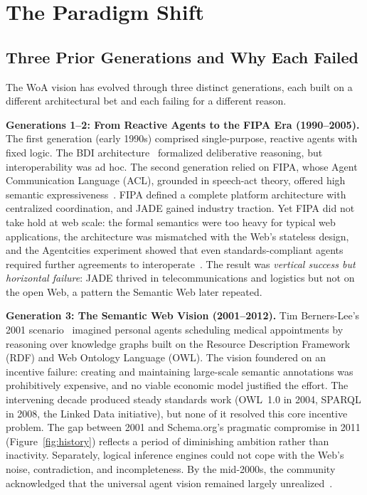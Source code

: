 \documentclass[10pt,twocolumn]{article}
\begin{document}
\section{The Paradigm Shift}\label{sec:paradigm}

\subsection{Three Prior Generations and Why Each Failed}

The WoA vision has evolved through three distinct generations, each built on a different architectural bet and each failing for a different reason.

\textbf{Generations 1--2: From Reactive Agents to the FIPA Era (1990--2005).}  The first generation (early 1990s) comprised single-purpose, reactive agents with fixed logic. The BDI architecture~\cite{Rao_1995} formalized deliberative reasoning, but interoperability was ad hoc.  The second generation relied on FIPA, whose Agent Communication Language (ACL), grounded in speech-act theory, offered high semantic expressiveness~\cite{FIPA_2002, Poslad_2007}. FIPA defined a complete platform architecture with centralized coordination, and JADE gained industry traction. Yet FIPA did not take hold at web scale: the formal semantics were too heavy for typical web applications, the architecture was mismatched with the Web's stateless design, and the Agentcities experiment showed that even standards-compliant agents required further agreements to interoperate~\cite{Ciortea_2019}. The result was \emph{vertical success but horizontal failure}: JADE thrived in telecommunications and logistics but not on the open Web, a pattern the Semantic Web later repeated.

\textbf{Generation 3: The Semantic Web Vision (2001--2012).}  Tim Berners-Lee's 2001 scenario~\cite{Berners-Lee_2001} imagined personal agents scheduling medical appointments by reasoning over knowledge graphs built on the Resource Description Framework (RDF) and Web Ontology Language (OWL). The vision foundered on an incentive failure: creating and maintaining large-scale semantic annotations was prohibitively expensive, and no viable economic model justified the effort. The intervening decade produced steady standards work (OWL~1.0 in 2004, SPARQL in 2008, the Linked Data initiative), but none of it resolved this core incentive problem. The gap between 2001 and Schema.org's pragmatic compromise in 2011 (Figure~\ref{fig:history}) reflects a period of diminishing ambition rather than inactivity. Separately, logical inference engines could not cope with the Web's noise, contradiction, and incompleteness. By the mid-2000s, the community acknowledged that the universal agent vision remained largely unrealized~\cite{Hogan_2020}.
\end{document}
